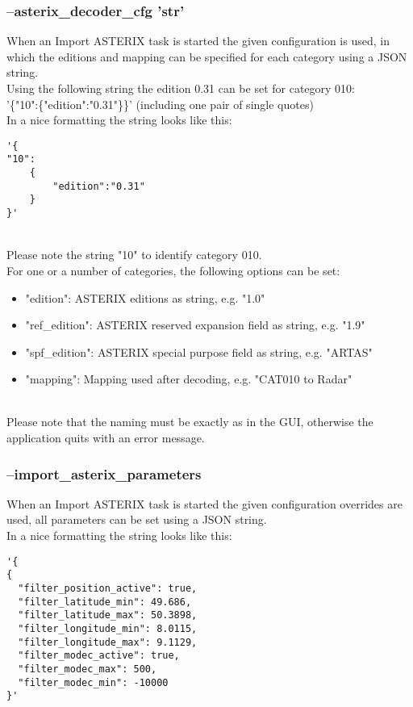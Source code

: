 \subsubsection{--asterix\_decoder\_cfg 'str'}

When an Import ASTERIX task is started the given configuration is used, in which the editions and mapping can be specified for each category using a JSON string. \\

Using the following string the edition 0.31 can be set for category 010:  \\
'\{"10":\{"edition":"0.31"\}\}' (including one pair of single quotes) \\

In a nice formatting the string looks like this:
\begin{lstlisting}[basicstyle=\small\ttfamily]
'{
"10":
    {
        "edition":"0.31"
    }
}'
\end{lstlisting}
\ \\

Please note the string "10" to identify category 010. \\

For one or a number of categories, the following options can be set:

\begin{itemize}
\item "edition":  ASTERIX editions as string, e.g. "1.0"
\item "ref\_edition":  ASTERIX reserved expansion field as string, e.g. "1.9"
\item "spf\_edition": ASTERIX special purpose field as string, e.g. "ARTAS"
\item "mapping": Mapping used after decoding, e.g. "CAT010 to Radar"
\end{itemize}
\ \\

Please note that the naming must be exactly as in the GUI, otherwise the application quits with an error message.

\subsubsection{--import\_asterix\_parameters}

When an Import ASTERIX task is started the given configuration overrides are used, all parameters can be set using a JSON string. \\

In a nice formatting the string looks like this:
\begin{lstlisting}[basicstyle=\small\ttfamily]
'{
{
  "filter_position_active": true,
  "filter_latitude_min": 49.686,
  "filter_latitude_max": 50.3898,
  "filter_longitude_min": 8.0115,
  "filter_longitude_max": 9.1129,
  "filter_modec_active": true,
  "filter_modec_max": 500,
  "filter_modec_min": -10000
}'
\end{lstlisting}
\ \\

